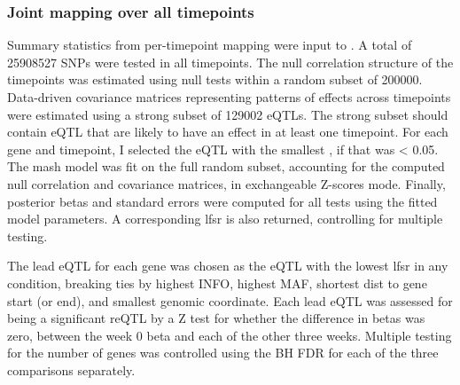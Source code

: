 \subsubsection{Joint  mapping over all timepoints}

Summary statistics from per-timepoint mapping were input to  \autocite{urbut2018FlexibleStatisticalMethods}.
A total of \num{25908527} \glspl{SNP} were tested in all timepoints.
The null correlation structure of the timepoints was estimated using null tests within a random subset of \num{200000}.
Data-driven covariance matrices representing patterns of effects across timepoints were estimated using a strong subset of \num{129002} \glspl{eQTL}.
The strong subset should contain \gls{eQTL} that are likely to have an effect in at least one timepoint.
For each gene and timepoint, I selected the \gls{eQTL} with the smallest \pvalue, if that \pvalue was < 0.05.
The mash model was fit on the full random subset, accounting for the computed null correlation and covariance matrices, in exchangeable Z-scores mode.
Finally, posterior betas and standard errors were computed for all tests using the fitted model parameters.
A corresponding \gls{lfsr} is also returned, controlling for multiple testing.

The lead \gls{eQTL} for each gene was chosen as the \gls{eQTL} with the lowest \gls{lfsr} in any condition, 
breaking ties by highest INFO, highest \gls{MAF}, shortest dist to gene start (or end), and smallest genomic coordinate.
Each lead \gls{eQTL} was assessed for being a significant \gls{reQTL} by a Z test for whether the difference in betas was zero, between the week 0 beta and each of the other three weeks.
Multiple testing for the number of genes was controlled using the \gls{BH} \gls{FDR} for each of the three comparisons separately.


